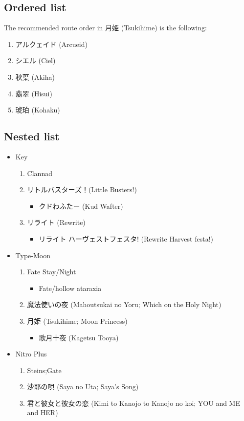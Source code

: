 \documentclass[letterpaper, 12pt]{article}
\begin{document}
\subsection{Ordered list}

The recommended route order in 月姫 (Tsukihime) is the following:
\begin{enumerate}
    \item アルクェイド (Arcueid)
    \item シエル (Ciel)
    \item 秋葉 (Akiha)
    \item 翡翠 (Hisui)
    \item 琥珀 (Kohaku)
\end{enumerate}

\subsection{Nested list}
\begin{itemize}
    \item{Key}
    \begin{enumerate}
        \item Clannad
        \item リトルバスターズ！(Little Busters!)
            \begin{itemize}
                \item クドわふたー (Kud Wafter)
            \end{itemize}
        \item リライト (Rewrite)
            \begin{itemize}
                \item リライト ハーヴェストフェスタ! (Rewrite Harvest festa!)
            \end{itemize}
    \end{enumerate}
    \item Type-Moon
    \begin{enumerate}
        \item Fate Stay/Night
            \begin{itemize}
                \item Fate/hollow ataraxia
            \end{itemize}
        \item 魔法使いの夜 (Mahoutsukai no Yoru; Which on the Holy Night)
        \item 月姫 (Tsukihime; Moon Princess)
            \begin{itemize}
                \item 歌月十夜 (Kagetsu Tooya)
            \end{itemize}
    \end{enumerate}
    \item Nitro Plus
    \begin{enumerate}
        \item Steins;Gate
        \item 沙耶の唄 (Saya no Uta; Saya's Song)
        \item 君と彼女と彼女の恋 (Kimi to Kanojo to Kanojo no koi; YOU and ME and HER)
    \end{enumerate}
\end{itemize}
\end{document}
